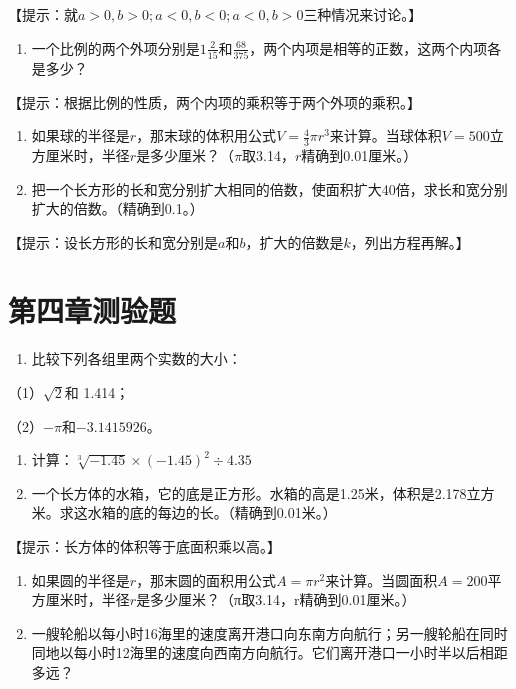 【提示：就\(a > 0, b > 0; a < 0, b < 0; a < 0, b > 0\)三种情况来讨论。】

\begin{enumerate}[start=4]
\item
  一个比例的两个外项分别是\(1 \frac{2}{15}\)和\(\frac{68}{375}\)，两个内项是相等的正数，这两个内项各是多少？
\end{enumerate}

【提示：根据比例的性质，两个内项的乘积等于两个外项的乘积。】

\begin{enumerate}[start=5]
\item
  如果球的半径是\(r\)，那末球的体积用公式\(V = \frac{4}{3} \pi r^3\)来计算。当球体积\(V = 500\)立方厘米时，半径\(r\)是多少厘米？（\(\pi\)取3.14，\(r\)精确到0.01厘米。）
\item
  把一个长方形的长和宽分别扩大相同的倍数，使面积扩大40倍，求长和宽分别扩大的倍数。（精确到0.1。）
\end{enumerate}

【提示：设长方形的长和宽分别是\(a\)和\(b\)，扩大的倍数是\(k\)，列出方程再解。】

\section{第四章测验题}

\begin{enumerate}
\item
  比较下列各组里两个实数的大小：
\end{enumerate}

（1）\(\sqrt{2}\)和 1.414；

（2）\(-\pi\)和\(-3.1415926\)。

\begin{enumerate}[start=2]
\item
  计算：\(\sqrt[3]{-1.45}\times(-1.45)^{2}\div4.35\)
\item
  一个长方体的水箱，它的底是正方形。水箱的高是1.25米，体积是2.178立方米。求这水箱的底的每边的长。（精确到0.01米。）
\end{enumerate}

【提示：长方体的体积等于底面积乘以高。】

\begin{enumerate}[start=4]
\item
  如果圆的半径是\(r\)，那末圆的面积用公式\(A = \pi r^2\)来计算。当圆面积\(A = 200\)平方厘米时，半径\(r\)是多少厘米？（π取3.14，r精确到0.01厘米。）
\item
  一艘轮船以每小时16海里的速度离开港口向东南方向航行；另一艘轮船在同时同地以每小时12海里的速度向西南方向航行。它们离开港口一小时半以后相距多远？
\end{enumerate}

